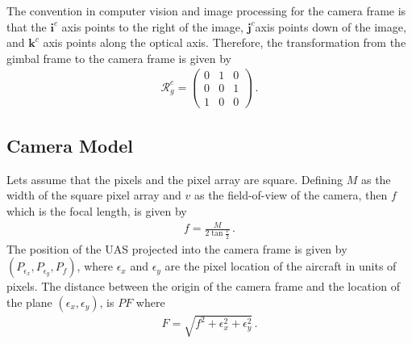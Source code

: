 The convention in computer vision and image processing for the camera frame is that the $\boldsymbol{i}^c$ axis points to the right of the image, $\boldsymbol{j}^c$axis points down of the image, and $\boldsymbol{k}^c$ axis points along the optical axis. Therefore, the transformation from the gimbal frame to the camera frame is given by
\begin{align}
\mathcal{R}^c_{g}=
\begin{pmatrix}
0 & 1 & 0 \\
0 & 0 & 1 \\
1 & 0 & 0
\end{pmatrix}\,.
\end{align}

\subsection{Camera Model}{\label{sub:camera_model}}
Lets assume that the pixels and the pixel array are square. Defining $M$ as the width of the square pixel array and $v$ as the field-of-view of the camera, then $f$ which is the focal length, is given by
\begin{align}
f=\frac{M}{2\tan\frac{v}{2}}\,.
\end{align}
The position of the UAS projected into the camera frame is given by $(P_{\epsilon_x},P_{\epsilon_y},P_f)$, where $\epsilon_x$ and $\epsilon_y$ are the pixel location of the aircraft in units of pixels. The distance between the origin of the camera frame and the location of the plane $(\epsilon_x,\epsilon_y)$, is $PF$ where
\begin{align}
F=\sqrt{f^2+\epsilon_x^2+\epsilon_y^2}\,.
\end{align}

